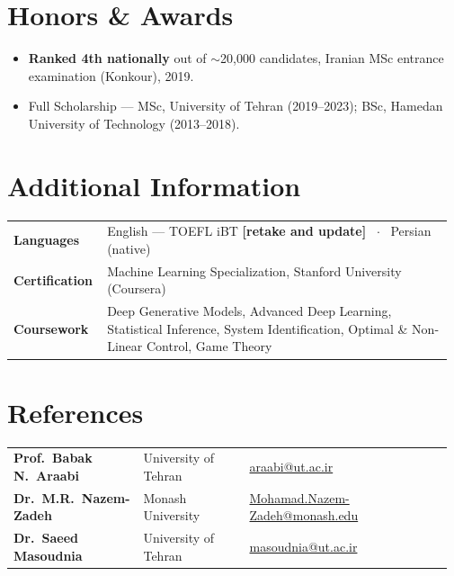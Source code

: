 \documentclass[10pt,a4paper]{article}
\newif\ifdraft
\newcommand{\fillme}[1]{%
  \ifdraft{\color{todo}\bfseries[FILL: #1]}\else\textbf{[#1]}\fi}
\begin{document}
\section{Honors \& Awards}
\begin{itemize}
  \item \textbf{Ranked 4th nationally} out of $\sim$20,000 candidates, Iranian MSc entrance
        examination (Konkour), 2019.
  \item Full Scholarship --- MSc, University of Tehran (2019--2023); BSc, Hamedan University of
        Technology (2013--2018).
\end{itemize}

\section{Additional Information}

\begin{tabular}{@{}>{\bfseries}p{0.20\linewidth}p{0.77\linewidth}@{}}
Languages     & English --- TOEFL iBT \fillme{retake and update} \ $\cdot$ \ Persian (native) \\[2pt]
Certification & Machine Learning Specialization, Stanford University (Coursera) \\[2pt]
Coursework    & Deep Generative Models, Advanced Deep Learning, Statistical Inference,
                System Identification, Optimal \& Non-Linear Control, Game Theory \\
\end{tabular}

\section{References}

\begin{tabular}{@{}p{0.27\linewidth}p{0.24\linewidth}>{\raggedright\arraybackslash\small}p{0.46\linewidth}@{}}
\textbf{Prof.\ Babak N.\ Araabi}       & University of Tehran & \href{mailto:araabi@ut.ac.ir}{araabi@ut.ac.ir} \\[1.5pt]
\textbf{Dr.\ M.R.\ Nazem-Zadeh}        & Monash University    & \href{mailto:Mohamad.Nazem-Zadeh@monash.edu}{Mohamad.Nazem-Zadeh@monash.edu} \\[1.5pt]
\textbf{Dr.\ Saeed Masoudnia}          & University of Tehran & \href{mailto:masoudnia@ut.ac.ir}{masoudnia@ut.ac.ir} \\
\end{tabular}
\end{document}
